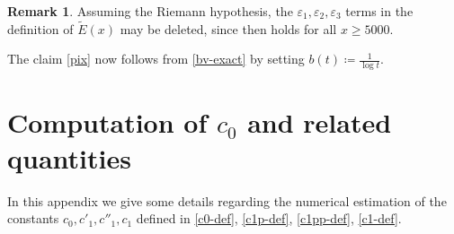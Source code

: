 \documentclass[10pt,a4paper,reqno]{amsart}
\numberwithin{equation}{section}
\theoremstyle{plain}
\theoremstyle{definition}
\newtheorem{remark}[theorem]{Remark}
\newcommand\eps{\varepsilon}
\begin{document}
\begin{remark} Assuming the Riemann hypothesis, the $\eps_1, \eps_2, \eps_3$ terms in the definition of $\tilde E(x)$ may be deleted, since \cite[(7.3)]{buthe} then holds for all $x \geq 5000$.  
\end{remark}

The claim \eqref{pix} now follows from \eqref{bv-exact} by setting $b(t) \coloneqq \frac{1}{\log t}$.  

\section{Computation of \texorpdfstring{$c_0$}{c\_0} and related quantities}\label{c0-app}

In this appendix we give some details regarding the numerical estimation of the constants $c_0, c'_1, c''_1, c_1$ defined in \eqref{c0-def}, \eqref{c1p-def}, \eqref{c1pp-def}, \eqref{c1-def}.  
\end{document}
